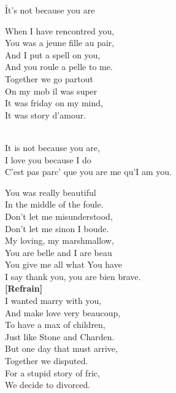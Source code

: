 \documentclass{novel}
\begin{document}
\newpage
\normalsize

\h*{It’s not because you are}

\begin{multicols}{2}
When I have rencontred you,\\
You was a jeune fille au pair,\\
And I put a spell on you,\\
And you roule a pelle to me.\\

Together we go partout\\
On my mob il was super\\
It was friday on my mind,\\
It was story d'amour.\\

\begin{bfseries}
[Refrain:]\\
It is not because you are,\\
I love you because I do\\
C'est pas parc' que you are me qu'I am you.\\
\end{bfseries}

You was really beautiful\\
In the middle of the foule.\\
Don't let me misunderstood,\\
Don't let me sinon I boude.\\

My loving, my marshmallow,\\
You are belle and I are beau\\
You give me all what You have\\
I say thank you, you are bien brave.\\

\textbf{[Refrain]}\\

I wanted marry with you,\\
And make love very beaucoup,\\
To have a max of children,\\
Just like Stone and Charden.\\

But one day that must arrive,\\
Together we disputed.\\
For a stupid story of fric,\\
We decide to divorced.\\


\end{multicols}
\end{document}
